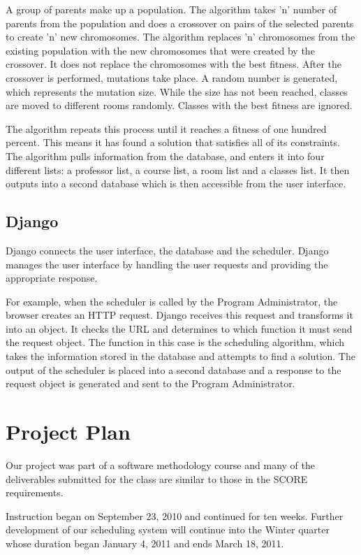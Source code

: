 \documentclass[12pt]{article}
\begin{document}
A group of parents make up a population. The algorithm takes 'n' number of parents from the population and does a crossover on pairs of the selected parents to create 'n' new chromosomes. The algorithm replaces 'n' chromosomes from the existing population with the new chromosomes that were created by the crossover. It does not replace the chromosomes with the best fitness. After the crossover is performed, mutations take place. A random number is generated, which represents the mutation size. While the size has not been reached, classes are moved to different rooms randomly. Classes with the best fitness are ignored. 

The algorithm repeats this process until it reaches a fitness of one hundred percent. This means it has found a solution that satisfies all of its constraints. The algorithm pulls information from the database, and enters it into four different lists: a professor list, a course list, a room list and a classes list. It then outputs into a second database which is then accessible from the user interface. 

\subsection{Django}
Django connects the user interface, the database and the scheduler. Django manages the user interface by handling the user requests and providing the appropriate response. 

For example, when the scheduler is called by the Program Administrator, the browser creates an HTTP request. Django receives this request and transforms it into an object. It checks the URL and determines to which function it must send the request object. The function in this case is the scheduling algorithm, which takes the information stored in the database and attempts to find a solution. The output of the scheduler is placed into a second database and a response to the request object is generated and sent to the Program Administrator.

\section{Project Plan} %

Our project was part of a software methodology course and many of the deliverables submitted for the class are similar to those in the SCORE requirements. 

Instruction began on September 23, 2010 and continued for ten weeks. Further development of our scheduling system will continue into the Winter quarter whose duration began January 4, 2011 and ends March 18, 2011. 
\end{document}
